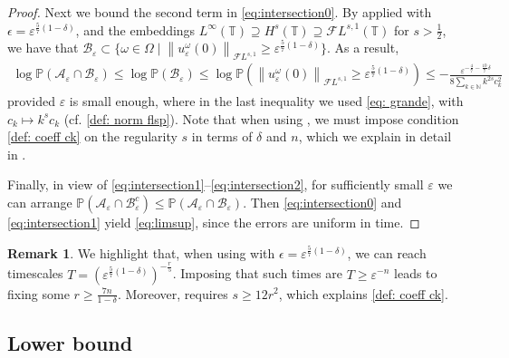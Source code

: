 \documentclass[a4paper,10pt,reqno]{article}
\theoremstyle{definition}
\theoremstyle{plain}
\theoremstyle{plain}
\theoremstyle{definition}
\theoremstyle{plain}
\theoremstyle{plain}
\theoremstyle{plain}
\theoremstyle{definition}
\newtheorem{rem}[definition]{Remark}
\theoremstyle{definition}
\newcommand{\norm}[1]{\left\lVert #1 \right\rVert}
\def \N{\mathbb N}
\def \P{{\mathbb P}}
\def \T{\mathbb{T}}
\def \A{\mathcal{A}}
\def \FL{\mathcal{F}L}
\def \B{\mathcal{B}}
\begin{document}
\begin{proof}
Next we bound the second term in \eqref{eq:intersection0}. 
By  applied with $\epsilon=\varepsilon^{\frac57 (1-\delta)}$, and the embeddings $L^{\infty}(\T) \supseteq H^s(\T) \supseteq \FL^{s,1}(\T)$ for $s > \frac{1}{2}$,
we have that $\B_{\varepsilon} \subset \{ \omega\in\mathbb{\Omega} \mid \norm{u^{\omega}_{\varepsilon}(0)}_{\FL^{s,1}}\geq \varepsilon^{\frac57 (1-\delta)}\}$. As a result, 
\begin{equation}\label{eq:intersection2}
\begin{split}
\log \P(\A_{\varepsilon} \cap \B_{\varepsilon}) \le \log \P(\B_{\varepsilon}) \leq \log \P\left(\norm{u^{\omega}_{\varepsilon}(0)}_{\FL^{s,1}}\geq \varepsilon^{\frac57 (1-\delta)}\right) \leq - \frac{ \varepsilon^{-\frac47 - \frac{10}{7} \delta}}{8\sum_{k\in\N} k^{2s} c_k^2}
\end{split}
\end{equation}
provided $\varepsilon$ is small enough, where in the last inequality we used \eqref{eq: grande}, with $c_k \mapsto k^s c_k$ (cf. \eqref{def: norm flsp}). Note that when using , we must impose condition \eqref{def: coeff ck} on the regularity $s$ in terms of $\delta$ and $n$, which we explain in detail in .

\smallskip

Finally, in view of  \eqref{eq:intersection1}--\eqref{eq:intersection2}, for sufficiently small $\varepsilon$ we can arrange $\P(\A_{\varepsilon} \cap \B_{\varepsilon}^c) \leq \P(\A_{\varepsilon} \cap \B_{\varepsilon})$. Then \eqref{eq:intersection0} and \eqref{eq:intersection1} yield \eqref{eq:limsup}, since the errors are uniform in time.
\end{proof}


\begin{rem}\label{rem: r n delta e tutti gli amici}
We highlight that, when using  with $\epsilon=\varepsilon^{\frac57 (1-\delta)}$, we can reach timescales $T=( \varepsilon^{\frac57 (1-\delta)})^{-\frac{r}{5}}$. Imposing that such times are $T\geq \varepsilon^{-n}$ leads to fixing some $r\geq \frac{7n}{1-\delta}$. Moreover,  requires $s\geq 12 r^2$, which explains \eqref{def: coeff ck}.
\end{rem}


\subsection{Lower bound} \label{subsection: the lower bound}
\end{document}
